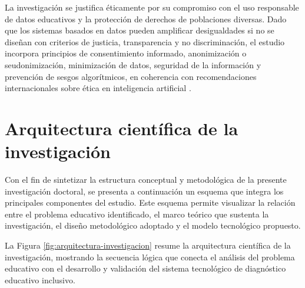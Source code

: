 \begin{refsection}
La investigación se justifica éticamente por su compromiso con el uso responsable de datos educativos y la protección de derechos de poblaciones diversas. Dado que los sistemas basados en datos pueden amplificar desigualdades si no se diseñan con criterios de justicia, transparencia y no discriminación, el estudio incorpora principios de consentimiento informado, anonimización o seudonimización, minimización de datos, seguridad de la información y prevención de sesgos algorítmicos, en coherencia con recomendaciones internacionales sobre ética en inteligencia artificial \parencite{unesco2021}.

\section{Arquitectura científica de la investigación}

Con el fin de sintetizar la estructura conceptual y metodológica de la presente investigación doctoral, se presenta a continuación un esquema que integra los principales componentes del estudio. Este esquema permite visualizar la relación entre el problema educativo identificado, el marco teórico que sustenta la investigación, el diseño metodológico adoptado y el modelo tecnológico propuesto.

La Figura \ref{fig:arquitectura-investigacion} resume la arquitectura científica de la investigación, mostrando la secuencia lógica que conecta el análisis del problema educativo con el desarrollo y validación del sistema tecnológico de diagnóstico educativo inclusivo.

\begin{figure}[htbp]
\centering
{}
\end{figure}
\end{refsection}

